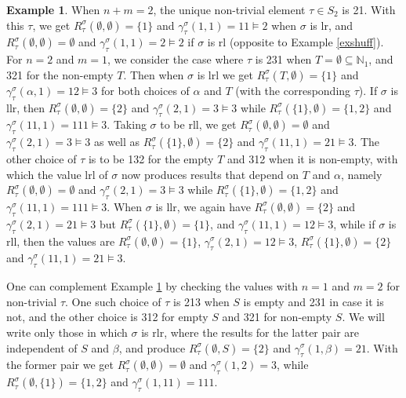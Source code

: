 \documentclass{article}
\theoremstyle{definition}
\newtheorem{ex}[thm]{Example}
\begin{document}
\begin{ex}
When $n+m=2$, the unique non-trivial element $\tau \in S_{2}$ is 21. With this $\tau$, we get $R^{\sigma}_{\tau}(\emptyset,\emptyset)=\{1\}$ and $\gamma^{\sigma}_{\tau}(1,1)=11\vDash2$ when $\sigma$ is lr, and $R^{\sigma}_{\tau}(\emptyset,\emptyset)=\emptyset$ and $\gamma^{\sigma}_{\tau}(1,1)=2\vDash2$ if $\sigma$ is rl (opposite to Example \ref{exshuff}). For $n=2$ and $m=1$, we consider the case where $\tau$ is 231 when $T=\emptyset\subseteq\mathbb{N}_{1}$, and 321 for the non-empty $T$. Then when $\sigma$ is lrl we get $R^{\sigma}_{\tau}(T,\emptyset)=\{1\}$ and $\gamma^{\sigma}_{\tau}(\alpha,1)=12\vDash3$ for both choices of $\alpha$ and $T$ (with the corresponding $\tau$). If $\sigma$ is llr, then $R^{\sigma}_{\tau}(\emptyset,\emptyset)=\{2\}$ and $\gamma^{\sigma}_{\tau}(2,1)=3\vDash3$ while $R^{\sigma}_{\tau}(\{1\},\emptyset)=\{1,2\}$ and $\gamma^{\sigma}_{\tau}(11,1)=111\vDash3$. Taking $\sigma$ to be rll, we get $R^{\sigma}_{\tau}(\emptyset,\emptyset)=\emptyset$ and $\gamma^{\sigma}_{\tau}(2,1)=3\vDash3$ as well as $R^{\sigma}_{\tau}(\{1\},\emptyset)=\{2\}$ and $\gamma^{\sigma}_{\tau}(11,1)=21\vDash3$. The other choice of $\tau$ is to be 132 for the empty $T$ and 312 when it is non-empty, with which the value lrl of $\sigma$ now produces results that depend on $T$ and $\alpha$, namely $R^{\sigma}_{\tau}(\emptyset,\emptyset)=\emptyset$ and $\gamma^{\sigma}_{\tau}(2,1)=3\vDash3$ while $R^{\sigma}_{\tau}(\{1\},\emptyset)=\{1,2\}$ and $\gamma^{\sigma}_{\tau}(11,1)=111\vDash3$. When $\sigma$ is llr, we again have $R^{\sigma}_{\tau}(\emptyset,\emptyset)=\{2\}$ and $\gamma^{\sigma}_{\tau}(2,1)=21\vDash3$ but $R^{\sigma}_{\tau}(\{1\},\emptyset)=\{1\}$, and $\gamma^{\sigma}_{\tau}(11,1)=12\vDash3$, while if $\sigma$ is rll, then the values are $R^{\sigma}_{\tau}(\emptyset,\emptyset)=\{1\}$, $\gamma^{\sigma}_{\tau}(2,1)=12\vDash3$, $R^{\sigma}_{\tau}(\{1\},\emptyset)=\{2\}$ and $\gamma^{\sigma}_{\tau}(11,1)=21\vDash3$. \label{shufftau}
\end{ex}
One can complement Example \ref{shufftau} by checking the values with $n=1$ and $m=2$ for non-trivial $\tau$. One such choice of $\tau$ is 213 when $S$ is empty and 231 in case it is not, and the other choice is 312 for empty $S$ and 321 for non-empty $S$. We will write only those in which $\sigma$ is rlr, where the results for the latter pair are independent of $S$ and $\beta$, and produce $R^{\sigma}_{\tau}(\emptyset,S)=\{2\}$ and $\gamma^{\sigma}_{\tau}(1,\beta)=21$. With the former pair we get $R^{\sigma}_{\tau}(\emptyset,\emptyset)=\emptyset$ and $\gamma^{\sigma}_{\tau}(1,2)=3$, while $R^{\sigma}_{\tau}(\emptyset,\{1\})=\{1,2\}$ and $\gamma^{\sigma}_{\tau}(1,11)=111$.
\end{document}

